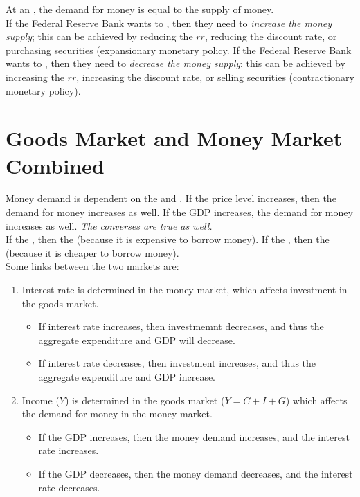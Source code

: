 \documentclass{article}
\begin{document}
At an , the demand for money is equal to the supply of money. \\ 

If the Federal Reserve Bank wants to , then they need to \emph{increase the money supply}; this can be achieved by reducing the $rr$, reducing the discount rate, or purchasing securities (expansionary monetary policy. If the Federal Reserve Bank wants to , then they need to \emph{decrease the money supply}; this can be achieved by increasing the $rr$, increasing the discount rate, or selling securities (contractionary monetary policy). \\ 

\section{Goods Market and Money Market Combined}

Money demand is dependent on the  and . If the price level increases, then the demand for money increases as well. If the GDP increases, the demand for money increases as well. \emph{The converses are true as well.} \\ 

If the , then the  (because it is expensive to borrow money). If the , then the  (because it is cheaper to borrow money). \\ 

Some links between the two markets are:
\begin{enumerate}
  \item Interest rate is determined in the money market, which affects investment in the goods market. 
    \begin{itemize}
      \item If interest rate increases, then investmemnt decreases, and thus the aggregate expenditure and GDP will decrease. 
      \item If interest rate decreases, then investment increases, and thus the aggregate expenditure and GDP increase. 
    \end{itemize}
  \item Income ($Y$) is determined in the goods market ($Y=C+I+G$) which affects the demand for money in the money market. 
    \begin{itemize}
      \item If the GDP increases, then the money demand increases, and the interest rate increases. 
      \item If the GDP decreases, then the money demand decreases, and the interest rate decreases. 
    \end{itemize}
\end{enumerate}
\end{document}
